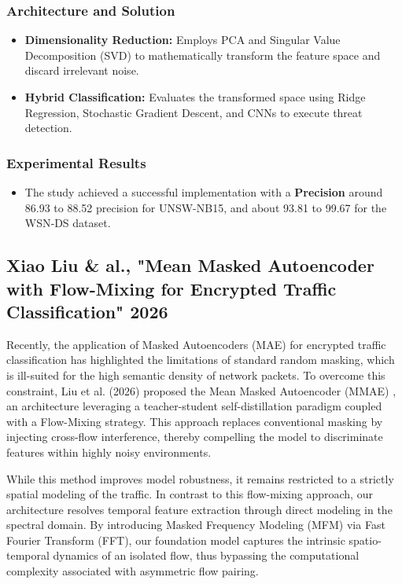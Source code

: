 \documentclass[12pt, a4paper]{report}
\begin{document}
\subsubsection{Architecture and Solution}
\begin{itemize}
    \item \textbf{Dimensionality Reduction:} Employs PCA and Singular Value Decomposition (SVD) to mathematically transform the feature space and discard irrelevant noise.
    \item \textbf{Hybrid Classification:} Evaluates the transformed space using Ridge Regression, Stochastic Gradient Descent, and CNNs to execute threat detection.
\end{itemize}

\subsubsection{Experimental Results}
\begin{itemize}
    \item The study achieved a successful implementation with a \textbf {Precision} around 86.93 to 88.52  precision for UNSW-NB15, and about 93.81 to 99.67 for the WSN‑DS dataset.  
\end{itemize}

\subsection{Xiao Liu \& al., "Mean Masked Autoencoder with Flow-Mixing for Encrypted Traffic Classification" 2026}
Recently, the application of Masked Autoencoders (MAE) for encrypted traffic classification has highlighted the limitations of standard random masking, which is ill-suited for the high semantic density of network packets. To overcome this constraint, Liu et al. (2026) proposed the Mean Masked Autoencoder (MMAE) \cite{liu2026mean}, an architecture leveraging a teacher-student self-distillation paradigm coupled with a Flow-Mixing strategy. This approach replaces conventional masking by injecting cross-flow interference, thereby compelling the model to discriminate features within highly noisy environments. 

While this method improves model robustness, it remains restricted to a strictly spatial modeling of the traffic. In contrast to this flow-mixing approach, our architecture resolves temporal feature extraction through direct modeling in the spectral domain. By introducing Masked Frequency Modeling (MFM) via Fast Fourier Transform (FFT), our foundation model captures the intrinsic spatio-temporal dynamics of an isolated flow, thus bypassing the computational complexity associated with asymmetric flow pairing.
\end{document}
